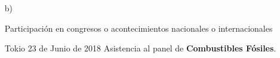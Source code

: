\begin{enumerate}[leftmargin=0.8cm]

  \item[b)]{Participación en congresos o acontecimientos nacionales o internacionales

    \begin{itemize}[leftmargin=0.2cm]

      {Tokio}
      {23 de Junio de 2018}
      {Asistencia al panel de \textbf{Combustibles Fósiles}.}

    \end{itemize}
  }

\end{enumerate}
